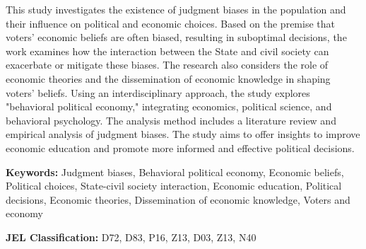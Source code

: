 \documentclass[
	article,
	12pt,
	oneside,
	a4paper,
	english,
	brazil,
	sumario=tradicional
]{abntex2}
\begin{document}
\frenchspacing

\maketitle
{}

	\begin{resumoumacoluna}
	\noindent
	This study investigates the existence of judgment biases in the population and their influence on political and economic choices. Based on the premise that voters' economic beliefs are often biased, resulting in suboptimal decisions, the work examines how the interaction between the State and civil society can exacerbate or mitigate these biases. The research also considers the role of economic theories and the dissemination of economic knowledge in shaping voters' beliefs. Using an interdisciplinary approach, the study explores "behavioral political economy," integrating economics, political science, and behavioral psychology. The analysis method includes a literature review and empirical analysis of judgment biases. The study aims to offer insights to improve economic education and promote more informed and effective political decisions.
	
	\textbf{Keywords:} Judgment biases, Behavioral political economy, Economic beliefs, Political choices, State-civil society interaction, Economic education, Political decisions, Economic theories, Dissemination of economic knowledge, Voters and economy
	
	\textbf{JEL Classification:} D72, D83, P16, Z13, D03, Z13, N40

	\end{resumoumacoluna}

\newpage
\end{document}
